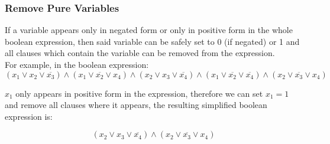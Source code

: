 	\subsubsection{Remove Pure Variables}

	If a variable appears only in negated form or only in positive form in the whole boolean expression, then said variable can be safely set to 0 (if negated) or 1 and all clauses which contain the variable can be removed from the expression.
	\\For example, in the boolean expression:
	\begin{equation*}
		(x_1 \lor x_2 \lor \overline{x_3}) \land (x_1 \lor \overline{x_2} \lor x_4) \land (x_2 \lor x_3 \lor \overline{x_4}) \land (x_1 \lor \overline{x_2} \lor \overline{x_4}) \land (x_2 \lor \overline{x_3} \lor x_4)
	\end{equation*}

	$x_1$ only appears in positive form in the expression, therefore we can set $x_1=1$ and remove all clauses where it appears, the resulting simplified boolean expression is:

	\begin{equation*}
		(x_2 \lor x_3 \lor \overline{x_4}) \land (x_2 \lor \overline{x_3} \lor x_4)
	\end{equation*}	